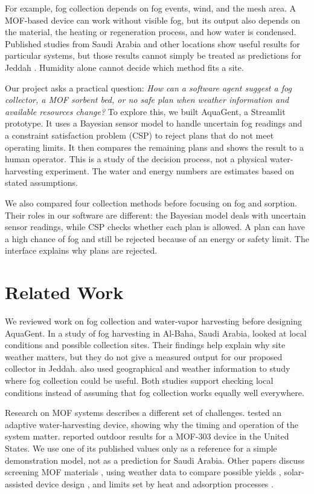 \documentclass[11pt,a4paper]{article}
\begin{document}
For example, fog collection depends on fog events, wind, and the mesh area. A MOF-based device can work without visible fog, but its output also depends on the material, the heating or regeneration process, and how water is condensed. Published studies from Saudi Arabia and other locations show useful results for particular systems, but those results cannot simply be treated as predictions for Jeddah \citep{alzahrani2025,song2023}. Humidity alone cannot decide which method fits a site.

\newpage\noindent Our project asks a practical question: \emph{How can a software agent suggest a fog collector, a MOF sorbent bed, or no safe plan when weather information and available resources change?} To explore this, we built AquaGent, a Streamlit prototype. It uses a Bayesian sensor model to handle uncertain fog readings and a constraint satisfaction problem (CSP) to reject plans that do not meet operating limits. It then compares the remaining plans and shows the result to a human operator. This is a study of the decision process, not a physical water-harvesting experiment. The water and energy numbers are estimates based on stated assumptions.

We also compared four collection methods before focusing on fog and sorption. Their roles in our software are different: the Bayesian model deals with uncertain sensor readings, while CSP checks whether each plan is allowed. A plan can have a high chance of fog and still be rejected because of an energy or safety limit. The interface explains why plans are rejected.




\section{Related Work}
We reviewed work on fog collection and water-vapor harvesting before designing AquaGent. In a study of fog harvesting in Al-Baha, Saudi Arabia, \citet{alzahrani2025} looked at local conditions and possible collection sites. Their findings help explain why site weather matters, but they do not give a measured output for our proposed collector in Jeddah. \citet{perez2025} also used geographical and weather information to study where fog collection could be useful. Both studies support checking local conditions instead of assuming that fog collection works equally well everywhere.

Research on MOF systems describes a different set of challenges. \citet{almassad2022} tested an adaptive water-harvesting device, showing why the timing and operation of the system matter. \citet{song2023} reported outdoor results for a MOF-303 device in the United States. We use one of its published values only as a reference for a simple demonstration model, not as a prediction for Saudi Arabia. Other papers discuss screening MOF materials \citep{li2022screening}, using weather data to compare possible yields \citep{wang2023global}, solar-assisted device design \citep{luo2023}, and limits set by heat and adsorption processes \citep{li2022limits}.
\end{document}
